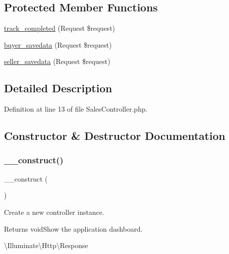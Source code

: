 \subsection*{Protected Member Functions}
\begin{DoxyCompactItemize}
\item 
\mbox{\hyperlink{class_responsive_1_1_http_1_1_controllers_1_1_sales_controller_a0a382fbac6510344a738649ecb2dda95}{track\+\_\+completed}} (Request \$request)
\item 
\mbox{\hyperlink{class_responsive_1_1_http_1_1_controllers_1_1_sales_controller_acaa311945d5dcb4df3f670f1a719cae7}{buyer\+\_\+savedata}} (Request \$request)
\item 
\mbox{\hyperlink{class_responsive_1_1_http_1_1_controllers_1_1_sales_controller_ae2dccfe17cdf0cf730208fd33a019c6f}{seller\+\_\+savedata}} (Request \$request)
\end{DoxyCompactItemize}


\subsection{Detailed Description}


Definition at line 13 of file Sales\+Controller.\+php.



\subsection{Constructor \& Destructor Documentation}
\mbox{\label{class_responsive_1_1_http_1_1_controllers_1_1_sales_controller_a095c5d389db211932136b53f25f39685}} 
\subsubsection{\texorpdfstring{\_\_construct()}{\_\_construct()}}
{\footnotesize\ttfamily \+\_\+\+\_\+construct (\begin{DoxyParamCaption}{ }\end{DoxyParamCaption})}

Create a new controller instance.

\begin{DoxyReturn}{Returns}
void\+Show the application dashboard.

\textbackslash{}\+Illuminate\textbackslash{}\+Http\textbackslash{}\+Response 
\end{DoxyReturn}


